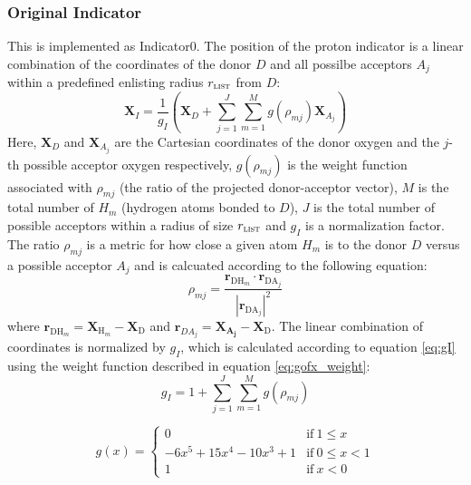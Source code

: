 \documentclass{article}
\newcommand{\mb}[1]{\mathbf{#1}}
\newcommand{\mr}[1]{\mathrm{#1}}
\begin{document}
\subsubsection{Original Indicator}\label{ss:original_indicator}
This is implemented as Indicator0.
The position of the proton  indicator is a linear combination of the coordinates of the donor $D$ and all possilbe acceptors $A_j$ within a predefined enlisting radius $r_\mathrm{\textsc{list}}$ from $D$:
\begin{equation}
\mathbf{X}_I = \frac{1}{g_I} \left( \mathbf{X}_D + \sum^{J}_{j=1} \sum^{M}_{m=1} g \left( \rho_{mj} \right) \mathbf{X}_{A_j} \right)
\end{equation}
Here, $\mathbf{X}_D$ and $\mathbf{X}_{A_{j}}$ are the Cartesian coordinates of the donor oxygen and the $j$-th possible acceptor oxygen respectively, $g ( \rho_{mj} )$ is the weight function associated with $\rho_{mj}$ (the ratio of the projected donor-acceptor vector), $M$ is the total number of $H_m$ (hydrogen atoms bonded to $D$), $J$ is the total number of possible acceptors within a radius of size $r_\mathrm{\textsc{list}}$ and $g_I$ is a normalization factor.
The ratio $\rho_{mj}$ is a metric for how close a given atom $H_m$ is to the donor $D$ versus a possible acceptor $A_j$ and is calcuated according to the following equation:
\begin{equation}
\rho_{mj}=\frac{ \mathbf{r}_{\mathrm{DH}_m} \cdot \mathbf{r}_{\mathrm{DA}_j} } { | \mathbf{r}_{\mathrm{DA}_j} |^2 }
\end{equation}
where $\mathbf{r}_{\mathrm{DH}_m} = \mb{X}_{\mathrm{H}_m} - \mb{X}_\mr{D}$ and $\mb{r}_{DA_j} = \mb{X_{A_j}} - \mb{X}_\mr{D}$.
The linear combination of coordinates is normalized by $g_I$, which is calculated according to equation \ref{eq:gI} using the weight function described in equation \ref{eq:gofx_weight}:
\begin{equation}\label{eq:gI}
g_I = 1 + \sum^J_{j=1} \sum^M_{m=1} g ( \rho_{mj} )
\end{equation}

\begin{equation} \label{eq:gofx_weight}
g(x) = \begin{cases}
0
& \mathrm{if}\ 1 \leq x \\
-6x^5 + 15x^4 - 10x^3 + 1
& \mathrm{if}\  0 \leq x < 1 \\
1
& \mathrm{if}\ x < 0 
\end{cases}
\end{equation}
\end{document}
